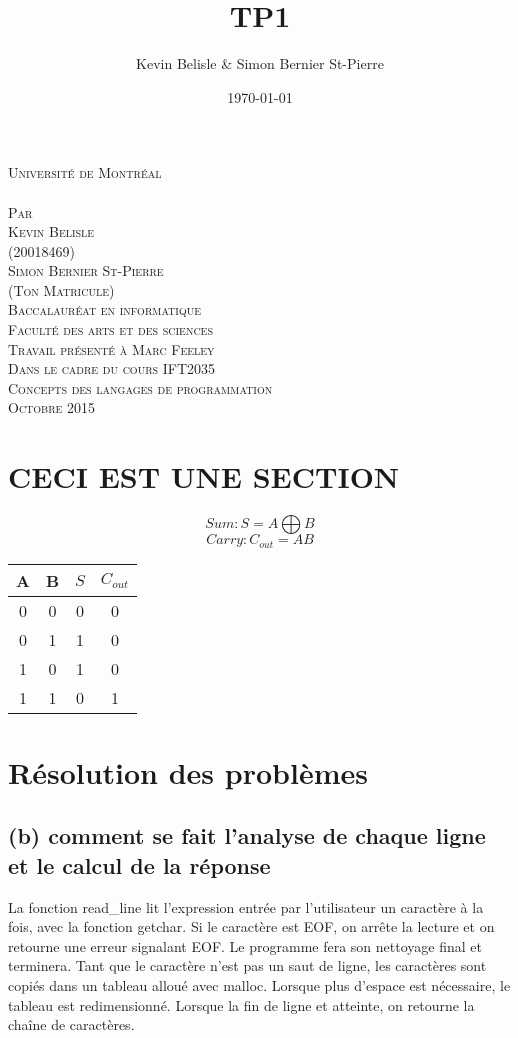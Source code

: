\documentclass[a4paper,12pt]{article}
\date{\today}
\author{Kevin Belisle \& Simon Bernier St-Pierre}
\title{TP1}
\newcommand{\Teacher}{Marc Feeley}
\newcommand{\ClassNum}{IFT2035}
\newcommand{\ClassName}{Concepts des langages de programmation}
\newcommand{\DateMMMMYYYY}{Octobre 2015}
\newcommand{\Author}{Kevin Belisle}
\newcommand{\Authorr}{Simon Bernier St-Pierre}
\begin{document}
\begin{titlepage}
	\begin{center}
		\textsc{\normalsize Université de Montréal}\\[2.5cm]

		\textsc{\LARGE \@title}\\[2.5cm]

		\textsc{\small Par}\\[0.25cm]
		\textsc{\LARGE \Author}\\[0.25cm]
		\textsc{\normalsize (20018469)}\\[0.25cm]
		\textsc{\LARGE \Authorr}\\[0.25cm]
		\textsc{\normalsize (Ton Matricule)}\\[2.5cm]

		\textsc{\normalsize Baccalauréat en informatique}\\
		\textsc{\normalsize Faculté des arts et des sciences}\\[2.5cm]

		\textsc{\small Travail présenté à \Teacher}\\
		\textsc{\small Dans le cadre du cours \ClassNum}\\
		\textsc{\small \ClassName}\\[2.5cm]

		\textsc{\normalsize \DateMMMMYYYY}\\[1.5cm]
	\end{center}
\end{titlepage}
\section{CECI EST UNE SECTION }
	\[Sum: S = A \bigoplus B\]
	\[Carry: C_{out} = AB\]
	\begin{tabular}{cc | cc}
		A&B&$S$&$C_{out}$\\
		\hline
		0&0&0&0\\
		0&1&1&0\\
		1&0&1&0\\
		1&1&0&1\\
	\end{tabular}
\section{Résolution des problèmes}
	\subsection{(b) comment se fait l’analyse de chaque ligne et le calcul de la réponse}
	La fonction read\_line lit l'expression entrée par l'utilisateur un caractère à la fois,
	avec la fonction getchar. Si le caractère est EOF, on arrête la lecture et on retourne
	une erreur signalant EOF. Le programme fera son nettoyage final et terminera. Tant que
	le caractère n'est pas un saut de ligne, les caractères sont copiés dans un tableau
	alloué avec malloc. Lorsque plus d'espace est nécessaire, le tableau est redimensionné.
	Lorsque la fin de ligne et atteinte, on retourne la chaîne de caractères.
\end{document}
